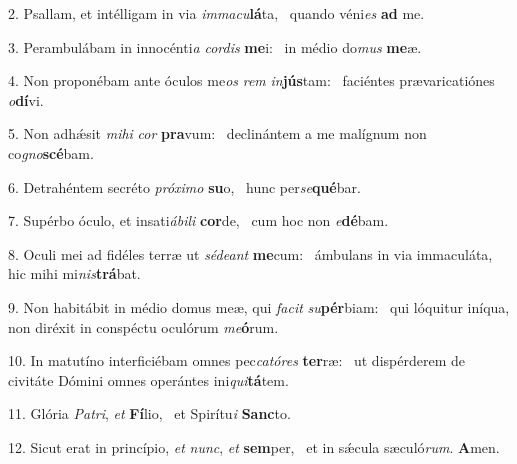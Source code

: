 2. Psallam, et intélligam in via \textit{im}\textit{ma}\textit{cu}\textbf{lá}ta, \ast\  quando véni\textit{es} \textbf{ad} me.\

3. Perambulábam in innocénti\textit{a} \textit{cor}\textit{dis} \textbf{me}i: \ast\  in médio do\textit{mus} \textbf{me}æ.\

4. Non proponébam ante óculos me\textit{os} \textit{rem} \textit{in}\textbf{jús}tam: \ast\  faciéntes prævaricatiónes \textit{o}\textbf{dí}vi.\

5. Non adhǽsit \textit{mi}\textit{hi} \textit{cor} \textbf{pra}vum: \ast\  declinántem a me malígnum non co\textit{gno}\textbf{scé}bam.\

6. Detrahéntem secréto \textit{pró}\textit{xi}\textit{mo} \textbf{su}o, \ast\  hunc per\textit{se}\textbf{qué}bar.\

7. Supérbo óculo, et insati\textit{á}\textit{bi}\textit{li} \textbf{cor}de, \ast\  cum hoc non \textit{e}\textbf{dé}bam.\

8. Oculi mei ad fidéles terræ ut \textit{sé}\textit{de}\textit{ant} \textbf{me}cum: \ast\  ámbulans in via immaculáta, hic mihi mi\textit{nis}\textbf{trá}bat.\

9. Non habitábit in médio domus meæ, qui \textit{fa}\textit{cit} \textit{su}\textbf{pér}biam: \ast\  qui lóquitur iníqua, non diréxit in conspéctu oculórum \textit{me}\textbf{ó}rum.\

10. In matutíno interficiébam omnes pec\textit{ca}\textit{tó}\textit{res} \textbf{ter}ræ: \ast\  ut dispérderem de civitáte Dómini omnes operántes ini\textit{qui}\textbf{tá}tem.\

11. Glória \textit{Pa}\textit{tri}, \textit{et} \textbf{Fí}lio, \ast\  et Spirítu\textit{i} \textbf{Sanc}to.\

12. Sicut erat in princípio, \textit{et} \textit{nunc}, \textit{et} \textbf{sem}per, \ast\  et in sǽcula sæculó\textit{rum}. \textbf{A}men.\

